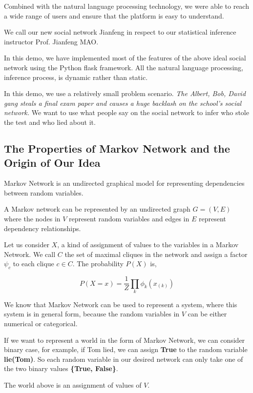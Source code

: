 \documentclass[
12pt, %
a4paper, %
oneside, %
headinclude,footinclude, %
BCOR5mm, %
]{scrartcl}
\begin{document}
Combined with the natural language processing technology, we were able to reach a wide range of users and ensure that the platform is easy to understand.

We call our new social network Jianfeng in respect to our statistical inference instructor Prof. Jianfeng MAO. 

In this demo, we have implemented most of the features of the above ideal social network using the Python flask framework. All the natural language processing, inference process, is dynamic rather than static.

In this demo, we use a relatively small problem scenario.
\textit{The Albert, Bob, David gang steals a final exam paper and causes a huge backlash on the school's social network.} We want to use what people say on the social network to infer who stole the test and who lied about it.

\subsection{The Properties of Markov Network and the Origin of Our Idea}
Markov Network is an undirected graphical model for representing dependencies between random variables.

A Markov network can be represented by an undirected graph $G = (V,E)$ where the nodes in $V$ represent random variables
and edges in $E$ represent dependency relationships.

Let us consider $X$, a kind of assignment of values to the variables in a Markov Network. We call $C$ the set of maximal
cliques in the network and assign a factor $\psi_c$ to each clique $c \in C$. The probability $P(X)$ is,

\begin{equation}
    P(X=x)=\frac{1}{Z}\prod_k\phi_k(x_{(k)})
\end{equation}

We know that Markov Network can be used to represent a system, where this system is in general form, because the random
variables in $V$ can be either numerical or categorical.

If we want to represent a world in the form of Markov Network, we can consider binary case, for example, if Tom lied, we
can assign \textbf{True} to the random variable \textbf{lie(Tom)}. So each random variable in our desired network can only take one of
the two binary values \textbf{\{True, False\}}.

The world above is an assignment of values of $V$.
\end{document}
